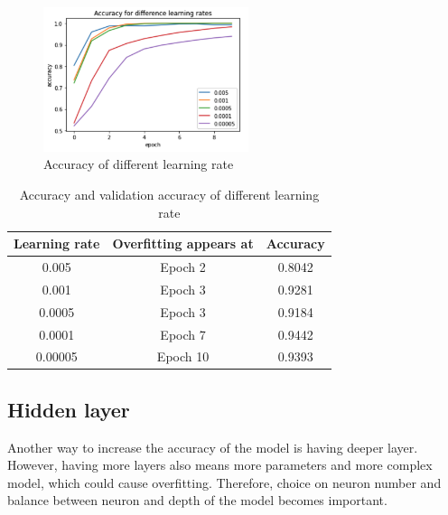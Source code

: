 \documentclass{article}
\begin{document}
\FloatBarrier
\begin{figure}[htb]
    \centering
    \includegraphics[width=6cm]{learningrate}
    \caption{Accuracy of different learning rate}
    \label{fig:lr}
\end{figure}
\FloatBarrier
\FloatBarrier
\begin{table}[htb]
\centering
\caption{Accuracy and validation accuracy of different learning rate}
	\begin{tabular}{||c c c ||} 
	 \hline
 	Learning rate&Overfitting appears at & Accuracy \\ [0.5ex] 
 	\hline\hline
 	0.005 & Epoch 2 & 0.8042\\
 	0.001 & Epoch 3 & 0.9281\\
 	0.0005 & Epoch 3 & 0.9184\\
 	0.0001 & Epoch 7 & 0.9442\\
 	0.00005 &  Epoch 10 &  0.9393\\               
 	\hline
	\end{tabular}
\label{learning rate}
\end{table}
\FloatBarrier

\subsection{Hidden layer}
Another way to increase the accuracy of the model is having deeper layer. However, having more layers also means more parameters and more complex model, which could cause overfitting. Therefore, choice on neuron number and balance between neuron and depth of the model becomes important.
\vspace{5.5pt}
\end{document}
